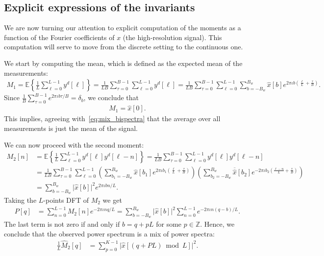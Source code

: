 \documentclass[english,12pt]{article}
\newcommand{\I}{\iota}
\newcommand{\tB}{B_w}
\newcommand{\hx}{\hat{x}}
\newcommand{\E}{\mathbb{E}}
\numberwithin{equation}{section}
\numberwithin{thm}{section} %
\begin{document}
\subsection{Explicit expressions of the invariants} \label{sec:expressions}

We are now turning our attention to explicit computation of the moments as a function of the Fourier coefficients of $x$ (the high-resolution signal). This computation will serve to move from the discrete setting to the continuous one. 

We start by computing the mean, which is defined as the expected mean of the measurements: 
\begin{equation}
\begin{split}
M_1 = \E\left\{ \frac{1}{L} \sum_{\ell=0}^{L-1} y^d[\ell]\right\} =  \frac{1}{LB}\sum_{\tau=0}^{B-1}\sum_{\ell=0}^{L-1} y^d[\ell] =  \frac{1}{LB}\sum_{\tau=0}^{B-1}\sum_{\ell=0}^{L-1}
\sum_{b=-\tB}^{\tB}\hat{x}[b]e^{2\pi\I b \left(\frac{\ell}{L} + \frac{\tau}{B}\right) }.
\end{split}
\end{equation}
Since $\frac{1}{B}\sum_{\tau=0}^{B-1}e^{2\pi\I b \tau/B}=\delta_b$, we conclude that 
\begin{equation} \label{eq:mean}
\begin{split}
M_1 = \hx[0].
\end{split}
\end{equation}
This  implies, agreeing with~\eqref{eq:mix_bispectra} that the average over all measurements is just the mean of the signal.  

We can now proceed with the second moment:
\begin{equation} \label{eq:ps}
\begin{split}
M_2[n] &= \E\left\{\frac{1}{L}\sum_{\ell=0}^{L-1} y^d[\ell]y^d[\ell-n]\right\} =  \frac{1}{LB}\sum_{\tau=0}^{B-1}\sum_{\ell=0}^{L-1} y^d[\ell]y^d[\ell-n] \\ &=  \frac{1}{LB}\sum_{\tau=0}^{B-1}\sum_{\ell=0}^{L-1}
\left(\sum_{b_1=-\tB}^{\tB}\hat{x}[b_1]e^{2\pi\I b_1 \left(\frac{\ell}{L} + \frac{\tau}{B}\right)} \right)
\left(\sum_{b_2=-\tB}^{\tB}\overline{\hx}[b_2]e^{-2\pi\I b_2 \left(\frac{\ell-n}{L} + \frac{\tau}{B}\right)} \right) \\
&=
\sum_{b=-\tB}^{\tB}\vert \hat{x}[b]\vert ^2e^{2\pi\I bn/L}.
\end{split}
\end{equation}
Taking the $L$-points DFT of $M_2$ we get 
\begin{equation}
\begin{split}
P[q] &= \sum_{n=0}^{L-1}M_2[n]e^{-2\pi\I nq/L} = \sum_{b=-\tB}^{\tB}\vert \hat{x}[b]\vert^2\sum_{n=0}^{L-1}e^{-2\pi\I n(q-b)/L}.
\end{split}
\end{equation}
The last term is not zero if and only if $b = q + pL$ for some $p\in\mathbb{Z}$.  Hence, we conclude that the observed power spectrum is a mix of power spectra:
\begin{equation}
\begin{split}
\frac{1}{L}\hat{M}_2[q] &=  \sum_{p=0}^{K-1} \vert \hat{x}[(q+PL)\bmod L]\vert^2.
\end{split}
\end{equation}
\end{document}
